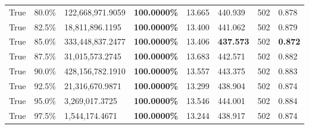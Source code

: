 \begin{table}[H]
\begin{tabular}{lllrllll}
\cline{1-8}
True & 80.0\% & 122,668,971.9059 & \bfseries \color{red} 100.0000\% & 13.665 & 440.939 & 502 & 0.878 \\
\cline{1-8}
True & 82.5\% & 18,811,896.1195 & \bfseries \color{red} 100.0000\% & 13.400 & 441.062 & 502 & 0.879 \\
\cline{1-8}
True & 85.0\% & 333,448,837.2477 & \bfseries \color{red} 100.0000\% & 13.406 & \bfseries \color{red} 437.573 & 502 & \bfseries \color{red} 0.872 \\
\cline{1-8}
True & 87.5\% & 31,015,573.2745 & \bfseries \color{red} 100.0000\% & 13.683 & 442.571 & 502 & 0.882 \\
\cline{1-8}
True & 90.0\% & 428,156,782.1910 & \bfseries \color{red} 100.0000\% & 13.557 & 443.375 & 502 & 0.883 \\
\cline{1-8}
True & 92.5\% & 21,316,670.9871 & \bfseries \color{red} 100.0000\% & 13.299 & 438.904 & 502 & 0.874 \\
\cline{1-8}
True & 95.0\% & 3,269,017.3725 & \bfseries \color{red} 100.0000\% & 13.546 & 444.001 & 502 & 0.884 \\
\cline{1-8}
True & 97.5\% & 1,544,174.4671 & \bfseries \color{red} 100.0000\% & 13.244 & 438.917 & 502 & 0.874 \\
\cline{1-8}
\bottomrule
\end{tabular}
\end{table}
